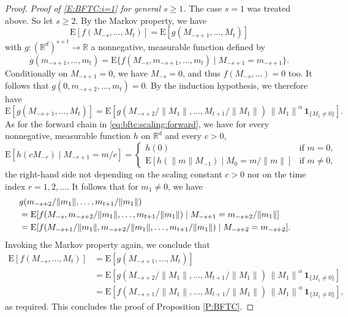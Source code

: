 \documentclass{aptpubarxiv}
\numberwithin{equation}{section}
\begin{document}
\begin{proof}
\emph{Proof of \eqref{E:BFTC:i=1} for general $s \ge 1$.} 
The case $s = 1$ was treated above. So let $s \ge 2$. By the Markov property, we have
\[
  {\mathrm{E}} [ f ( M_{-s}, \ldots, M_t ) ] = {\mathrm{E}} [ g ( M_{-s+1}, \ldots, M_t ) ]
\]
with $g : ({\mathbb{R}}^d)^{s+t} \to {\mathbb{R}}$ a nonnegative, measurable function defined by
\[
  g ( m_{-s+1}, \ldots, m_t )
  = {\mathrm{E}} \{ f ( M_{-s}, m_{-s+1}, \ldots, m_t ) \mid M_{-s+1} = m_{-s+1} \}.
\]
Conditionally on $M_{-s+1} = 0$, we have $M_{-s} = 0$, and thus $f ( M_{-s}, \ldots ) = 0$ too. It follows that $g ( 0, m_{-s+2}, \ldots, m_t ) = 0$. By the induction hypothesis, we therefore have
\begin{equation*}
  {\mathrm{E}} [ g ( M_{-s+1}, \ldots, M_t ) ]
  = {\mathrm{E}} [ g ( M_{-s+2} / {\|{M_1}\|}, \ldots, M_{t+1} / {\|{M_1}\|} ) \, {\|{M_1}\|}^\alpha \, {\boldsymbol{1}}_{ \{ M_1 \ne 0 \} } ].
\end{equation*}
As for the forward chain in \eqref{eq:bftc:scaling:forward}, we have for every nonnegative, measurable function $h$ on ${\mathbb{R}}^d$ and every $c>0$,
\begin{equation}
\label{eq:bftc:scaling:backward}
 {\mathrm{E}} [ h( c M_{-r} ) \mid M_{-r+1} = m/c ]
  = \begin{cases} h(0) & \text{if $m = 0$,} \\ {\mathrm{E}} [ h( {\|{m}\|} M_{-1} ) \mid M_0 = m / {\|{m}\|} ] & \text{if $m \ne 0$,} \end{cases}
\end{equation}
the right-hand side not depending on the scaling constant $c > 0$ nor on the time index $r = 1, 2, \ldots$. It follows that for $m_1 \ne 0$, we have
\begin{align*}
  \lefteqn{
  g ( m_{-s+2} / {\|{m_1}\|}, \ldots, m_{t+1} / {\|{m_1}\|} )
  } \\
  &= {\mathrm{E}} [ f ( M_{-s}, m_{-s+2} / {\|{m_1}\|}, \ldots, m_{t+1} / {\|{m_1}\|}) \mid M_{-s+1} = m_{-s+2} / {\|{m_1}\|} ] \\
  &= {\mathrm{E}} [ f ( M_{-s+1} / {\|{m_1}\|}, m_{-s+2} / {\|{m_1}\|}, \ldots, m_{t+1} / {\|{m_1}\|}) \mid M_{-s+2} = m_{-s+2} ].
\end{align*}
Invoking the Markov property again, we conclude that
\begin{align*}
    {\mathrm{E}} [ f ( M_{-s}, \ldots, M_t ) ]
  &= {\mathrm{E}} [ g ( M_{-s+1}, \ldots, M_t ) ] \\
  &= {\mathrm{E}} [ g ( M_{-s+2} / {\|{M_1}\|}, \ldots, M_{t+1} / {\|{M_1}\|} ) \, {\|{M_1}\|}^\alpha \, {\boldsymbol{1}}_{ \{ M_1 \ne 0 \} } ] \\
  &= {\mathrm{E}} [ f ( M_{-s+1} / {\|{M_1}\|}, \ldots, M_{t+1} / {\|{M_1}\|} ) \, {\|{M_1}\|}^\alpha \, {\boldsymbol{1}}_{ \{ M_1 \ne 0 \} } ],
\end{align*}
as required. This concludes the proof of Proposition \ref{P:BFTC}.
\end{proof}
\end{document}
